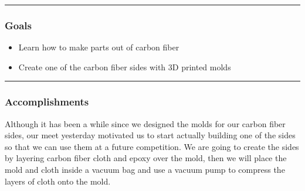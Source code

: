 \noindent\hfil\rule{\textwidth}{.4pt}\hfil
\subsubsection*{Goals}
\begin{itemize}
    \item Learn how to make parts out of carbon fiber
	\item Create one of the carbon fiber sides with 3D printed molds

\end{itemize} 

\noindent\hfil\rule{\textwidth}{.4pt}\hfil

\subsubsection*{Accomplishments}
Although it has been a while since we designed the molds for our carbon fiber sides, our meet yesterday motivated us to start actually building one of the sides so that we can use them at a future competition. We are going to create the sides by layering carbon fiber cloth and epoxy over the mold, then we will place the mold and cloth inside a vacuum bag and use a vacuum pump to compress the layers of cloth onto the mold. 

